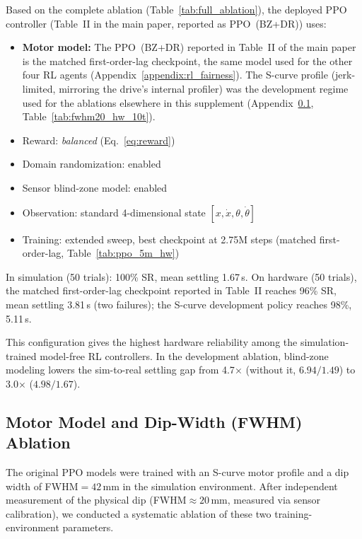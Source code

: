 Based on the complete ablation (Table~\ref{tab:full_ablation}), the
deployed PPO controller (Table~II in the main paper, reported as
PPO~(BZ+DR)) uses:
\begin{itemize}
  \item \textbf{Motor model:} The PPO~(BZ+DR) reported in Table~II of the
        main paper is the matched first-order-lag checkpoint, the same
        model used for the other four RL agents
        (Appendix~\ref{appendix:rl_fairness}). The S-curve profile
        (jerk-limited, mirroring the drive's internal profiler) was the
        development regime used for the ablations elsewhere in this
        supplement (Appendix~\ref{appendix:motor_fwhm_ablation},
        Table~\ref{tab:fwhm20_hw_10t}).
  \item Reward: \emph{balanced} (Eq.~\ref{eq:reward})
  \item Domain randomization: enabled
  \item Sensor blind-zone model: enabled
  \item Observation: standard 4-dimensional state
    $[x, \dot{x}, \theta, \dot{\theta}]$
  \item Training: extended sweep, best checkpoint at 2.75M steps
    (matched first-order-lag, Table~\ref{tab:ppo_5m_hw})
\end{itemize}

In simulation (50 trials): 100\% SR, mean settling 1.67\,s.
On hardware (50 trials), the matched first-order-lag checkpoint reported
in Table~II reaches 96\% SR, mean settling 3.81\,s (two failures); the
S-curve development policy reaches 98\%, 5.11\,s.

This configuration gives the highest hardware reliability among the
simulation-trained model-free RL controllers. In the development ablation, blind-zone modeling
lowers the sim-to-real settling gap from 4.7$\times$ (without it, $6.94/1.49$) to
3.0$\times$ ($4.98/1.67$).

\subsection{Motor Model and Dip-Width (FWHM) Ablation}
\label{appendix:motor_fwhm_ablation}

The original PPO models were trained with an S-curve motor profile
and a dip width of FWHM$= 42$\,mm in the simulation environment.
After independent measurement of the physical dip (FWHM$\approx 20$\,mm,
measured via sensor calibration), we conducted a systematic ablation
of these two training-environment parameters.


